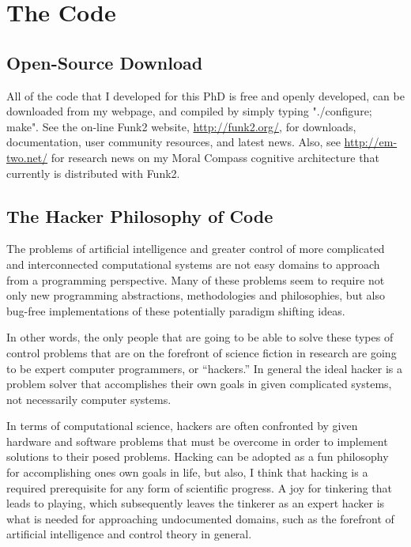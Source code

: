 \chapter{The Code}\label{appendix:the_code}

\section{Open-Source Download}

All of the code that I developed for this PhD is free and openly
developed, can be downloaded from my webpage, and compiled by simply
typing "./configure; make".  See the on-line Funk2 website,
\url{http://funk2.org/}, for downloads, documentation, user community
resources, and latest news.  Also, see \url{http://em-two.net/} for
research news on my Moral Compass cognitive architecture that
currently is distributed with Funk2.

\section{The Hacker Philosophy of Code}

The problems of artificial intelligence and greater control of more
complicated and interconnected computational systems are not easy
domains to approach from a programming perspective.  Many of these
problems seem to require not only new programming abstractions,
methodologies and philosophies, but also bug-free implementations of
these potentially paradigm shifting ideas.

In other words, the only people that are going to be able to solve
these types of control problems that are on the forefront of science
fiction in research are going to be expert computer programmers, or
``hackers.''  In general the ideal hacker is a problem solver that
accomplishes their own goals in given complicated systems, not
necessarily computer systems.

In terms of computational science, hackers are often confronted by
given hardware and software problems that must be overcome in order to
implement solutions to their posed problems.  Hacking can be adopted
as a fun philosophy for accomplishing ones own goals in life, but
also, I think that hacking is a required prerequisite for any form of
scientific progress.  A joy for tinkering that leads to playing, which
subsequently leaves the tinkerer as an expert hacker is what is needed
for approaching undocumented domains, such as the forefront of
artificial intelligence and control theory in general.

